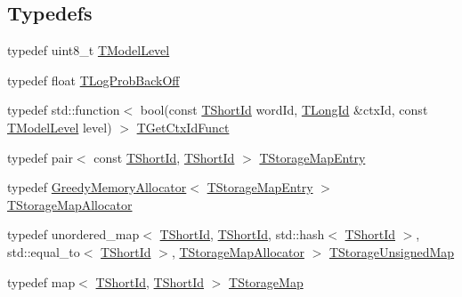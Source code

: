\subsection*{Typedefs}
\begin{DoxyCompactItemize}
\item 
typedef uint8\+\_\+t \hyperlink{namespaceuva_1_1smt_1_1tries_a20577a44b3a42d26524250634379b7cb}{T\+Model\+Level}
\item 
typedef float \hyperlink{namespaceuva_1_1smt_1_1tries_acd0660255dd9ef5d644f01de49102750}{T\+Log\+Prob\+Back\+Off}
\item 
typedef std\+::function$<$ bool(const \hyperlink{namespaceuva_1_1smt_1_1hashing_adcf22e1982ad09d3a63494c006267469}{T\+Short\+Id} word\+Id, \hyperlink{namespaceuva_1_1smt_1_1hashing_a5992ac0dea0fb3226fb403ede09fad55}{T\+Long\+Id} \&ctx\+Id, const \hyperlink{namespaceuva_1_1smt_1_1tries_a20577a44b3a42d26524250634379b7cb}{T\+Model\+Level} level) $>$ \hyperlink{namespaceuva_1_1smt_1_1tries_a535548b30b94f85d4b3457a383f8076e}{T\+Get\+Ctx\+Id\+Funct}
\item 
typedef pair$<$ const \hyperlink{namespaceuva_1_1smt_1_1hashing_adcf22e1982ad09d3a63494c006267469}{T\+Short\+Id}, \hyperlink{namespaceuva_1_1smt_1_1hashing_adcf22e1982ad09d3a63494c006267469}{T\+Short\+Id} $>$ \hyperlink{namespaceuva_1_1smt_1_1tries_affc598132a51209f50d781cf01733996}{T\+Storage\+Map\+Entry}
\item 
typedef \hyperlink{classuva_1_1smt_1_1tries_1_1alloc_1_1_greedy_memory_allocator}{Greedy\+Memory\+Allocator}$<$ \hyperlink{namespaceuva_1_1smt_1_1tries_affc598132a51209f50d781cf01733996}{T\+Storage\+Map\+Entry} $>$ \hyperlink{namespaceuva_1_1smt_1_1tries_a80642b3331407e41b0aca518e3a1ac31}{T\+Storage\+Map\+Allocator}
\item 
typedef unordered\+\_\+map$<$ \hyperlink{namespaceuva_1_1smt_1_1hashing_adcf22e1982ad09d3a63494c006267469}{T\+Short\+Id}, \hyperlink{namespaceuva_1_1smt_1_1hashing_adcf22e1982ad09d3a63494c006267469}{T\+Short\+Id}, std\+::hash$<$ \hyperlink{namespaceuva_1_1smt_1_1hashing_adcf22e1982ad09d3a63494c006267469}{T\+Short\+Id} $>$, std\+::equal\+\_\+to$<$ \hyperlink{namespaceuva_1_1smt_1_1hashing_adcf22e1982ad09d3a63494c006267469}{T\+Short\+Id} $>$, \hyperlink{namespaceuva_1_1smt_1_1tries_a80642b3331407e41b0aca518e3a1ac31}{T\+Storage\+Map\+Allocator} $>$ \hyperlink{namespaceuva_1_1smt_1_1tries_a51747124086c47f6b3eb7b66599dbc81}{T\+Storage\+Unsigned\+Map}
\item 
typedef map$<$ \hyperlink{namespaceuva_1_1smt_1_1hashing_adcf22e1982ad09d3a63494c006267469}{T\+Short\+Id}, \hyperlink{namespaceuva_1_1smt_1_1hashing_adcf22e1982ad09d3a63494c006267469}{T\+Short\+Id} $>$ \hyperlink{namespaceuva_1_1smt_1_1tries_adcb2d50a97c40fe1a3509d9f798c1d3b}{T\+Storage\+Map}
\end{DoxyCompactItemize}
